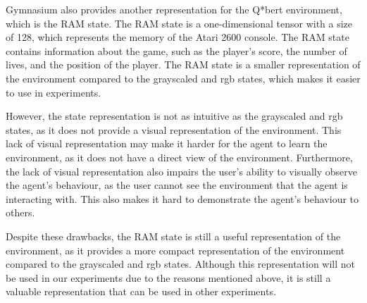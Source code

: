 Gymnasium also provides another representation for the Q*bert environment,
which is the RAM state. The RAM state is a one-dimensional tensor with a size
of 128, which represents the memory of the Atari 2600 console. The RAM state
contains information about the game, such as the player's score, the number of
lives, and the position of the player. The RAM state is a smaller
representation of the environment compared to the grayscaled and \gls{rgb}
states, which makes it easier to use in experiments.

However, the state representation is not as intuitive as the grayscaled and
\gls{rgb} states, as it does not provide a visual representation of the
environment. This lack of visual representation may make it harder for the
agent to learn the environment, as it does not have a direct view of the
environment. Furthermore, the lack of visual representation also impairs the
user's ability to visually observe the agent's behaviour, as the user cannot
see the environment that the agent is interacting with. This also makes it
hard to demonstrate the agent's behaviour to others.

Despite these drawbacks, the RAM state is still a useful representation of the
environment, as it provides a more compact representation of the environment
compared to the grayscaled and \gls{rgb} states. Although this representation
will not be used in our experiments due to the reasons mentioned above, it is
still a valuable representation that can be used in other experiments.